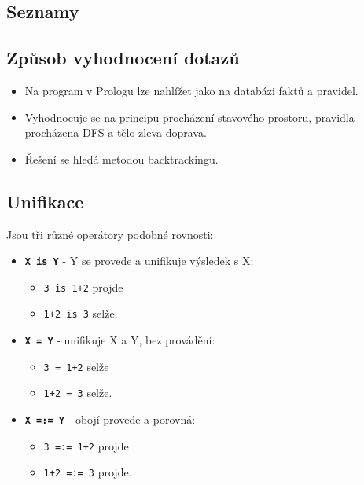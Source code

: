 \documentclass{szzclass}
\begin{document}
\subsection{Seznamy}
\begin{itemize}
\item \texttt{[] %
\item \texttt{[1]}
\item \texttt{[1,2,3]}
\item \texttt{[[1,2], 3]}
\item \texttt{[a | [b,c]] %
\end{itemize}

\subsection{Způsob vyhodnocení dotazů}
\begin{itemize}
\item Na program v Prologu lze nahlížet jako na databázi faktů a pravidel.
\item Vyhodnocuje se na principu procházení stavového prostoru, pravidla procházena DFS a tělo zleva doprava.
\item Řešení se hledá metodou backtrackingu.
\end{itemize}

\subsection{Unifikace}
Jsou tři různé operátory podobné rovnosti:
\begin{samepage}
\begin{itemize}
\item \textbf{\texttt{X is Y}} - Y se provede a unifikuje výsledek s X:
  \begin{itemize}
  \item \texttt{3 is 1+2} projde
  \item \texttt{1+2 is 3} selže.
  \end{itemize}
\item \textbf{\texttt{X = Y}} - unifikuje X a Y, bez provádění:
  \begin{itemize}
    \item \texttt{3 = 1+2} selže
    \item \texttt{1+2 = 3} selže.
  \end{itemize}
\item \textbf{\texttt{X =:= Y}} - obojí provede a porovná:
  \begin{itemize}
    \item \texttt{3 =:= 1+2} projde
    \item \texttt{1+2 =:= 3} projde.
  \end{itemize}
\end{itemize}
\end{samepage}
\end{document}
